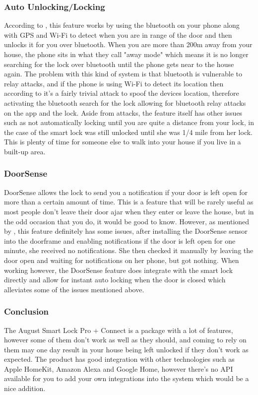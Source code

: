 \subsubsection*{Auto Unlocking/Locking}
According to \cite{August2017}, this feature works by using the bluetooth on your phone along with GPS and Wi-Fi to detect when you are in range of the door and then unlocks it for you over bluetooth. When you are more than 200m away from your house, the phone sits in what they call "away mode" which means it is no longer searching for the lock over bluetooth until the phone gets near to the house again. The problem with this kind of system is that bluetooth is vulnerable to relay attacks, and if the phone is using Wi-Fi to detect its location then according to \cite{Feng2014} it's a fairly trivial attack to spoof the devices location, therefore activating the bluetooth search for the lock allowing for bluetooth relay attacks on the app and the lock. Aside from attacks, the feature itself has other issues such as not automatically locking until you are quite a distance from your lock, in the case of \cite{So2017} the smart lock was still unlocked until she was 1/4 mile from her lock. This is plenty of time for someone else to walk into your house if you live in a built-up area.

\subsubsection*{DoorSense}
DoorSense allows the lock to send you a notification if your door is left open for more than a certain amount of time. This is a feature that will be rarely useful as most people don't leave their door ajar when they enter or leave the house, but in the odd occasion that you do, it would be good to know. However, as mentioned by \cite{So2017}, this feature definitely has some issues, after installing the DoorSense sensor into the doorframe and enabling notifications if the door is left open for one minute, she received no notifications. She then checked it manually by leaving the door open and waiting for notifications on her phone, but got nothing. When working however, the DoorSense feature does integrate with the smart lock directly and allow for instant auto locking when the door is closed which alleviates some of the issues mentioned above.

\subsubsection*{Conclusion}
The August Smart Lock Pro + Connect is a package with a lot of features, however some of them don't work as well as they should, and coming to rely on them may one day result in your house being left unlocked if they don't work as expected. The product has good integration with other technologies such as Apple HomeKit, Amazon Alexa and Google Home, however there's no API available for you to add your own integrations into the system which would be a nice addition.


